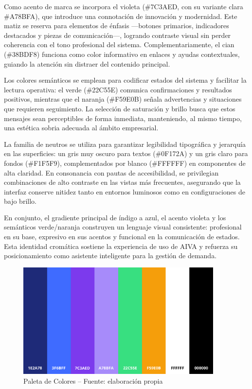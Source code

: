 Como acento de marca se incorpora el violeta (\#7C3AED, con su variante clara \#A78BFA), que introduce una connotación de innovación y modernidad. Este matiz se reserva para elementos de énfasis —botones primarios, indicadores destacados y piezas de comunicación—, logrando contraste visual sin perder coherencia con el tono profesional del sistema. Complementariamente, el cian (\#38BDF8) funciona como color informativo en enlaces y ayudas contextuales, guiando la atención sin distraer del contenido principal.

Los colores semánticos se emplean para codificar estados del sistema y facilitar la lectura operativa: el verde (\#22C55E) comunica confirmaciones y resultados positivos, mientras que el naranja (\#F59E0B) señala advertencias y situaciones que requieren seguimiento. La selección de saturación y brillo busca que estos mensajes sean perceptibles de forma inmediata, manteniendo, al mismo tiempo, una estética sobria adecuada al ámbito empresarial.

La familia de neutros se utiliza para garantizar legibilidad tipográfica y jerarquía en las superficies: un gris muy oscuro para textos (\#0F172A) y un gris claro para fondos (\#F1F5F9), complementados por blanco (\#FFFFFF) en componentes de alta claridad. En consonancia con pautas de accesibilidad, se privilegian combinaciones de alto contraste en las vistas más frecuentes, asegurando que la interfaz conserve nitidez tanto en entornos luminosos como en configuraciones de bajo brillo.

En conjunto, el gradiente principal de índigo a azul, el acento violeta y los semánticos verde/naranja construyen un lenguaje visual consistente: profesional en su base, expresivo en sus acentos y funcional en la comunicación de estados. Esta identidad cromática sostiene la experiencia de uso de AIVA y refuerza su posicionamiento como asistente inteligente para la gestión de demanda.

\begin{figure}[!htbp]
  \centering
  \includegraphics[width=0.92\textwidth]{images/paleta-aiva.png}
  \caption{Paleta de Colores -- Fuente: elaboración propia}
  \label{fig:paleta-aiva}
\end{figure}

